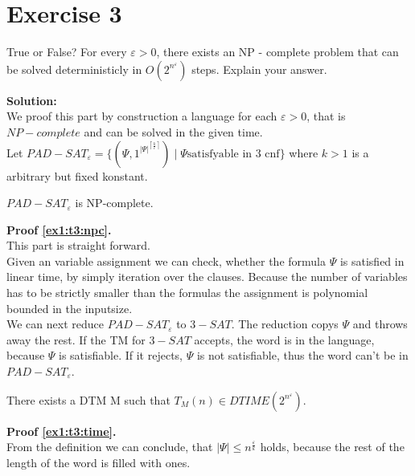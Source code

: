 \section*{Exercise 3}

True or False? For every $\varepsilon > 0$, there exists an NP - complete problem that can be solved deterministicly in
$O(2^{n^\varepsilon})$ steps. Explain your answer.

\textbf{Solution:}\\

We proof this part by construction a language for each $\varepsilon > 0$, that is $NP - complete$ and can be solved in
the given time.\\

Let $PAD-SAT_\varepsilon = \{ (\Psi , 1^{|\Psi|^{\left\lceil \frac{k}{\varepsilon} \right\rceil}}) \; | \; \Psi \text{satisfyable in 3 cnf} \}$
where $k > 1$ is a arbitrary but fixed konstant.\\

\pagebreak

\begin{lemma}\label{ex1:t3:npc}
    $PAD-SAT_\varepsilon$ is NP-complete.
\end{lemma}

\textbf{Proof \ref{ex1:t3:npc}.}\\
This part is straight forward.\\
Given an variable assignment we can check, whether the formula $\Psi$ is satisfied in linear time, by simply iteration over
the clauses. Because the number of variables has to be strictly smaller than the formulas the assignment is polynomial bounded
in the inputsize.\\

We can next reduce $PAD-SAT_\varepsilon$ to $3-SAT$. The reduction copys $\Psi$ and throws away the rest. If 
the TM for $3 - SAT$ accepts, the word is in the language, because $\Psi$ is satisfiable. If it rejects,
$\Psi$ is not satisfiable, thus the word can't be in $PAD-SAT_\varepsilon$.

\begin{lemma}\label{ex1:t3:time}
    There exists a DTM M such that $T_M(n) \in DTIME (2^{n^\varepsilon})$.
\end{lemma}

\textbf{Proof \ref{ex1:t3:time}.}\\

From the definition we can conclude, that $|\Psi| \leq n^{\frac{\varepsilon}{k}}$ holds,
because the rest of the length of the word is filled with ones.\\

